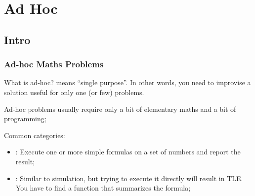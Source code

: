 \documentclass{beamer}
\begin{document}
\section{Ad Hoc}
\subsection{Intro}
\begin{frame}
  \frametitle{Ad-hoc Maths Problems}

  {\small
  \begin{block}{What is ad-hoc?}
     means ``single purpose''. In other words, you 
    need to improvise a solution useful for only one (or few) problems.

    \bigskip

    Ad-hoc problems usually require only a bit of elementary maths and
    a bit of programming;
  \end{block}

  Common categories:
  \begin{itemize}
  \item {}: Execute one or more simple formulas
    on a set of numbers and report the result;
  \item {}: Similar to simulation, but trying
    to execute it directly will result in TLE. You have to find a
    function that summarizes the formula;
  \end{itemize}}
\end{frame}
\end{document}
